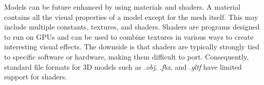 Models can be future enhanced by using materials and shaders.
A material contains all the visual properties of a model except for the mesh itself.
This may include multiple constants, textures, and shaders.
Shaders are programs designed to run on GPUs and can be used to combine textures in various ways to create interesting visual effects.
The downside is that shaders are typically strongly tied to specific software or hardware, making them difficult to port.
Consequently, standard file formats for 3D models such as \textit{.obj}, \textit{.fbx}, and \textit{.gltf} have limited support for shaders.
